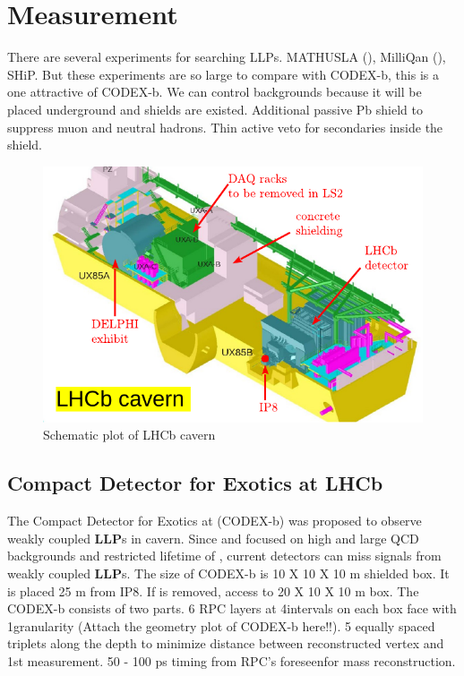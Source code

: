 \section{Measurement}
\label{sec:Measurement}

There are several experiments for searching LLPs. MATHUSLA (\atlas), MilliQan (\cms), SHiP. 
But these experiments are so large to compare with CODEX-b, this is a one attractive of CODEX-b. 
We can control backgrounds because it will be placed underground and shields are existed. 
Additional passive Pb shield to suppress muon and neutral hadrons. 
Thin active veto for secondaries inside the shield. 

\begin{figure}[h]
\centering
    \includegraphics[width=12cm]{figs/INT/lhcb_cavern.pdf}
    \vspace{0.15cm}
\caption{ 
   Schematic plot of LHCb cavern 
}
\end{figure}

\subsection{Compact Detector for Exotics at LHCb}

The Compact Detector for Exotics at \lhcb (CODEX-b) was proposed to observe weakly coupled \textbf{LLP}s in \lhcb cavern. 
Since \atlas and \cms focused on high \pt and large QCD backgrounds and restricted lifetime of \lhcb, current detectors can miss signals from weakly coupled \textbf{LLP}s. 
The size of CODEX-b is 10 X 10 X 10 m shielded box. It is placed 25 m from IP8. 
If \delphi is removed, access to 20 X 10 X 10 m box. 
The CODEX-b consists of two parts. 
6 RPC layers at 4\cm intervals on each box face with 1\cm granularity (Attach the geometry plot of CODEX-b here!!). 
5 equally spaced triplets along the depth to minimize distance between reconstructed vertex and 1st measurement. 
50 - 100 ps timing from RPC's foreseenfor mass reconstruction.

